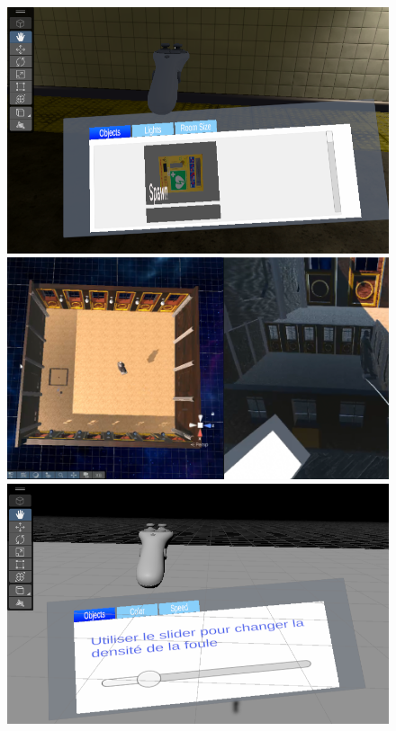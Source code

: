 \begin{figure}[h]
    \centering

    \begin{minipage}[b]{0.31\textwidth}
        \centering
        \includegraphics[width=\textwidth]{images/subwayhandmenu.png}
    \end{minipage}
    \hfill
    \begin{minipage}[b]{0.345\textwidth}
        \centering
        \includegraphics[width=\textwidth]{images/amphihandmenu.png}
    \end{minipage}
    \hfill
    \begin{minipage}[b]{0.32\textwidth}
        \centering
        \includegraphics[width=\textwidth]{images/foghandmenu.png}
    \end{minipage}


\end{figure}
